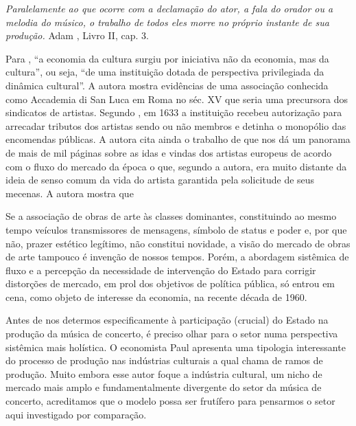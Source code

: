 \documentclass[a4paper, 12pt, openright, oneside, german, french, english, brazil]{abntex2}
\begin{document}
	\begin{citacao}
		\textit{Paralelamente ao que ocorre com a declamação do ator, a fala do orador ou a melodia do músico, o trabalho de todos eles morre no próprio instante de sua produção.} Adam , Livro II, cap. 3.
	\end{citacao}
	
	
	Para , ``a economia da cultura surgiu por iniciativa não da economia, mas da cultura'', ou seja, ``de uma instituição dotada de perspectiva privilegiada da dinâmica cultural''. A autora mostra evidências de uma associação conhecida como Accademia di San Luca em Roma no séc. XV que seria uma precursora dos sindicatos de artistas. Segundo , em 1633 a instituição recebeu autorização para arrecadar tributos dos artistas sendo ou não membros e detinha o monopólio das encomendas públicas. A autora cita ainda o trabalho de  que nos dá um panorama de mais de mil páginas sobre as idas e vindas dos artistas europeus de acordo com o fluxo do mercado da época o que, segundo a autora, era muito distante da ideia de senso comum da vida do artista garantida pela solicitude de seus mecenas. A autora mostra que
	
	\begin{citacao}
		Se a associação de obras de arte às classes dominantes, constituindo ao mesmo tempo veículos transmissores de mensagens, símbolo de status e poder e, por que não, prazer estético legítimo, não constitui novidade, a visão do mercado de obras de arte tampouco é invenção de nossos tempos. Porém, a abordagem sistêmica de fluxo e a percepção da necessidade de intervenção do Estado para corrigir distorções de mercado, em prol dos objetivos de política pública, só entrou em cena, como objeto de interesse da economia, na recente década de 1960. \cite[p. 51]{reis2007economia}
	\end{citacao}
	
	Antes de nos determos especificamente à participação (crucial) do Estado na produção da música de concerto, é preciso olhar para o setor numa perspectiva sistêmica mais holística. O economista Paul  apresenta uma tipologia interessante do processo de produção nas indústrias culturais a qual chama de ramos de produção. Muito embora esse autor foque a indústria cultural, um nicho de mercado mais amplo e fundamentalmente divergente do setor da música de concerto, acreditamos que o modelo possa ser frutífero para pensarmos o setor aqui investigado por comparação.
	
\end{document}
